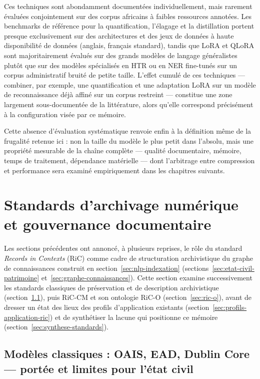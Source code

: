 Ces techniques sont abondamment documentées individuellement, mais rarement évaluées conjointement sur des corpus africains à faibles ressources annotées.
Les benchmarks de référence pour la quantification, l'élagage et la distillation portent presque exclusivement sur des architectures et des jeux de données à haute disponibilité de données (anglais, français standard), tandis que LoRA et QLoRA sont majoritairement évalués sur des grands modèles de langage généralistes plutôt que sur des modèles spécialisés en HTR ou en NER fine-tunés sur un corpus administratif bruité de petite taille.
L'effet cumulé de ces techniques --- combiner, par exemple, une quantification et une adaptation LoRA sur un modèle de reconnaissance déjà affiné sur un corpus restreint --- constitue une zone largement sous-documentée de la littérature, alors qu'elle correspond précisément à la configuration visée par ce mémoire.

Cette absence d'évaluation systématique renvoie enfin à la définition même de la frugalité retenue ici : non la taille du modèle le plus petit dans l'absolu, mais une propriété mesurable de la chaîne complète --- qualité documentaire, mémoire, temps de traitement, dépendance matérielle --- dont l'arbitrage entre compression et performance sera examiné empiriquement dans les chapitres suivants.

\section{Standards d'archivage numérique et gouvernance documentaire}
\label{sec:standards-archivage}

Les sections précédentes ont annoncé, à plusieurs reprises, le rôle du standard \textit{Records in Contexts} (RiC) comme cadre de structuration archivistique du graphe de connaissances construit en section~\ref{sec:nlp-indexation} (sections~\ref{sec:etat-civil-patrimoine} et~\ref{sec:graphe-connaissances}). Cette section examine successivement les standards classiques de préservation et de description archivistique (section~\ref{sec:standards-classiques}), puis RiC-CM et son ontologie RiC-O (section~\ref{sec:ric-o}), avant de dresser un état des lieux des profils d'application existants (section~\ref{sec:profils-application-ric}) et de synthétiser la lacune qui positionne ce mémoire (section~\ref{sec:synthese-standards}).

\subsection{Modèles classiques : OAIS, EAD, Dublin Core --- portée et limites pour l'état civil}
\label{sec:standards-classiques}

